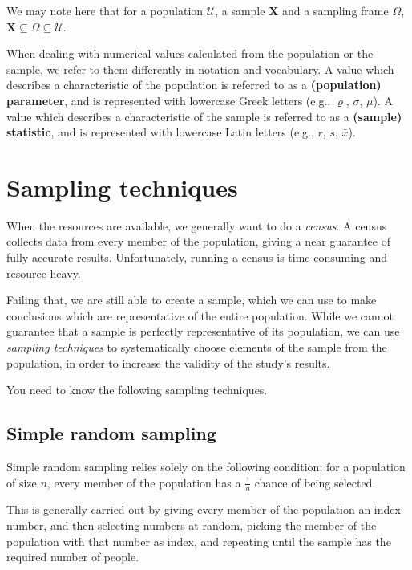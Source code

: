 We may note here that for a population $\mathcal{U}$, a sample $\symbf{X}$ and a sampling frame $\Omega$, $\symbf{X} \subseteq \Omega \subseteq \mathcal{U}$.

When dealing with numerical values calculated from the population or the sample, we refer to them differently in notation and vocabulary. A value which describes a characteristic of the population is referred to as a \textbf{(population) parameter}, and is represented with lowercase Greek letters (e.g., $\varrho$, $\sigma$, $\mu$). A value which describes a characteristic of the sample is referred to as a \textbf{(sample) statistic}, and is represented with lowercase Latin letters (e.g., $r$, $s$, $\bar{x}$).

\section{Sampling techniques}

When the resources are available, we generally want to do a \textit{census}. A census collects data from every member of the population, giving a near guarantee of fully accurate results. Unfortunately, running a census is time-consuming and resource-heavy.

Failing that, we are still able to create a sample, which we can use to make conclusions which are representative of the entire population. While we cannot guarantee that a sample is perfectly representative of its population, we can use \textit{sampling techniques} to systematically choose elements of the sample from the population, in order to increase the validity of the study's results.

You need to know the following sampling techniques.

\subsection{Simple random sampling}

\begin{tcolorbox}
    \begin{definition}
        Simple random sampling relies solely on the following condition: for a population of size $n$, every member of the population has a $\frac{1}{n}$ chance of being selected.
    \end{definition}
\end{tcolorbox}

This is generally carried out by giving every member of the population an index number, and then selecting numbers at random, picking the member of the population with that number as index, and repeating until the sample has the required number of people.

